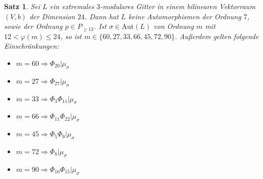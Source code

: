 \documentclass[12pt,a4paper,halfparskip,headsepline,bibtotocnumbered]{scrreprt}
\theoremstyle{nummermitklammern}
\newtheorem{satz}[defsatzusw]{Satz}
\theoremstyle{nonumberbreak}
\newcommand{\Aut}{\text{Aut}}
\begin{document}
\begin{framed}
	\begin{satz}
		Sei $L$ ein extremales $3$-modulares Gitter in einem bilinearen Vektorraum $(V,b)$ der Dimension $24$. Dann hat $L$ keine Automorphismen der Ordnung $7$, sowie der Ordnung $p \in P_{\ge 13}$. Ist $\sigma \in \Aut(L)$ von Ordnung $m$ mit $12 < \varphi(m) \leq 24$, so ist $m \in \lbrace 60, 27, 33, 66, 45, 72, 90 \rbrace$. Außerdem gelten folgende Einschränkungen:
		\begin{itemize}
			\item $m = 60 \Rightarrow \Phi_{20} \vert \mu_\sigma$
			\item $m = 27 \Rightarrow \Phi_{27} \vert \mu_\sigma$
			\item $m = 33 \Rightarrow \Phi_{3} \Phi_{11} \vert \mu_\sigma$
			\item $m = 66 \Rightarrow \Phi_{11} \Phi_{22} \vert \mu_\sigma$
			\item $m = 45 \Rightarrow \Phi_{5} \Phi_{9} \vert \mu_\sigma$
			\item $m = 72 \Rightarrow \Phi_8 \vert \mu_\sigma$
			\item $m = 90 \Rightarrow \Phi_{10} \Phi_{15} \vert \mu_\sigma$
		\end{itemize}
	\end{satz}
\end{framed}
\end{document}
